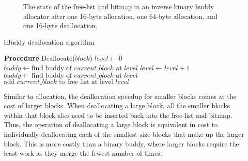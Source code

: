 \begin{figure}[h]
  \centering
  
  \caption{The state of the free-list and bitmap in an inverse binary buddy allocator after one
    16-byte allocation, one 64-byte allocation, and one 16-byte deallocation.}
  \label{fig:ibuddydeallocated}
\end{figure}

\begin{algorithm}[h]
  \caption{iBuddy deallocation algorithm}
  \label{alg:ibuddy_dealloc}
  \begin{algorithmic}[1]
    \Statex \textbf{Procedure} Deallocate($block$)
    \State $level \gets 0$
    \State $buddy \gets \text{find buddy of } current\_block \text{ at } level$
    \State $level \gets level + 1$
    \State $buddy \gets \text{find buddy of } current\_block \text{ at } level$
    \EndWhile
    \State $\text{add } current\_block \text{ to free list at level } level$
    \EndFor

  \end{algorithmic}
\end{algorithm}

Similar to allocation, the deallocation speedup for smaller blocks comes at the cost of larger blocks. When deallocating a large block, all the smaller blocks within that block also need to be inserted back into the free-list and bitmap. Thus, the operation of deallocating a large block is equivalent in cost to individually deallocating each of the smallest-size blocks that make up the larger block. This is more costly than a binary buddy, where larger blocks require the least work as they merge the fewest number of times.